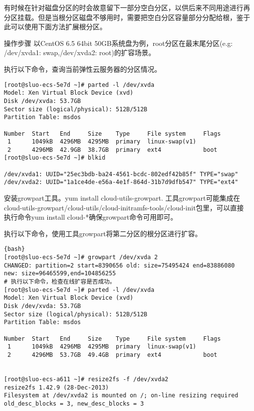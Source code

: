 有时候在针对磁盘分区的时会故意留下一部分空白分区，以供后来不同用途进行再分区挂载。但是当根分区磁盘不够用时，需要把空白分区容量部分分配给根，鉴于此可以使用下面方法扩展根分区。

操作步骤
以CentOS 6.5 64bit 50GB系统盘为例，root分区在最末尾分区(e.g: /dev/xvda1: swap,/dev/xvda2: root)的扩容场景。

执行以下命令，查询当前弹性云服务器的分区情况。

\begin{lstlisting}
[root@sluo-ecs-5e7d ~]# parted -l /dev/xvda
Model: Xen Virtual Block Device (xvd)
Disk /dev/xvda: 53.7GB
Sector size (logical/physical): 512B/512B
Partition Table: msdos

Number  Start   End     Size    Type     File system     Flags
 1      1049kB  4296MB  4295MB  primary  linux-swap(v1)
 2      4296MB  42.9GB  38.7GB  primary  ext4            boot
[root@sluo-ecs-5e7d ~]# blkid

/dev/xvda1: UUID="25ec3bdb-ba24-4561-bcdc-802edf42b85f" TYPE="swap" 
/dev/xvda2: UUID="1a1ce4de-e56a-4e1f-864d-31b7d9dfb547" TYPE="ext4" 
\end{lstlisting}

安装growpart工具。yum install cloud-utils-growpart. 
工具growpart可能集成在cloud-utils-growpart/cloud-utils/cloud-initramfs-tools/cloud-init包里，可以直接执行命令yum install cloud-*确保growpart命令可用即可。


执行以下命令，使用工具growpart将第二分区的根分区进行扩容。

\begin{lstlisting}{bash}
[root@sluo-ecs-5e7d ~]# growpart /dev/xvda 2
CHANGED: partition=2 start=8390656 old: size=75495424 end=83886080 new: size=96465599,end=104856255
# 执行以下命令，检查在线扩容是否成功。
[root@sluo-ecs-5e7d ~]# parted -l /dev/xvda
Model: Xen Virtual Block Device (xvd)
Disk /dev/xvda: 53.7GB
Sector size (logical/physical): 512B/512B
Partition Table: msdos

Number  Start   End     Size    Type     File system     Flags
 1      1049kB  4296MB  4295MB  primary  linux-swap(v1)
 2      4296MB  53.7GB  49.4GB  primary  ext4            boot


[root@sluo-ecs-a611 ~]# resize2fs -f /dev/xvda2
resize2fs 1.42.9 (28-Dec-2013)
Filesystem at /dev/xvda2 is mounted on /; on-line resizing required
old_desc_blocks = 3, new_desc_blocks = 3
\end{lstlisting}


